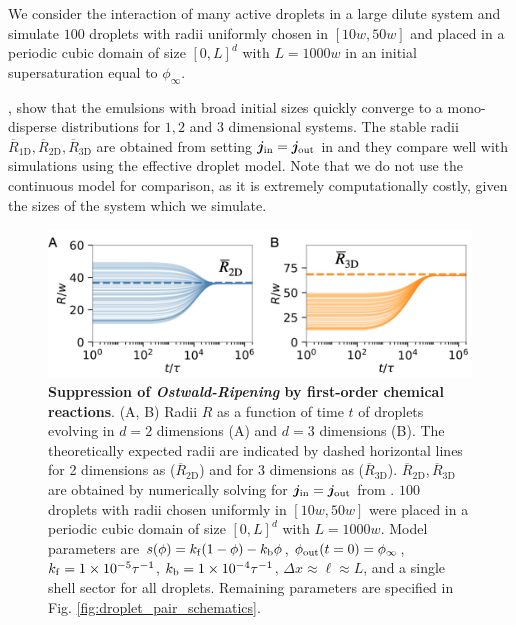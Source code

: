We consider the interaction of many active droplets in a large dilute system and simulate $100$ droplets with radii uniformly chosen in $[10w, 50w]$ and placed in a periodic cubic domain of size $[0, L]^d$ with $L=1000 w$ in an initial supersaturation equal to $\phi_\infty$.

,  show that the emulsions with broad initial sizes quickly converge to a mono-disperse  distributions for $1, 2$ and $3$ dimensional systems.
The stable radii $\overline{R}_\mathrm{1D}, \overline{R}_\mathrm{2D}, \overline{R}_\mathrm{3D}$ are obtained from setting $\boldsymbol{j}_\mathrm{in} = \boldsymbol{j}_\mathrm{out}$ in  and they compare well with simulations using the effective droplet model.
Note that we do not use the continuous model for comparison, as it is extremely computationally costly, given the sizes of the system which we simulate. 

\begin{figure}[tb]
\centering
\includegraphics[scale=0.5]{MainContent/Figures/active_emulsions.pdf}
\caption{
\textbf{Suppression of \textit{Ostwald-Ripening} by first-order chemical reactions}.
(A, B) Radii $R$ as a function of time $t$ of droplets evolving in $d=2$ dimensions (A) and $d=3$ dimensions (B).
The theoretically expected radii are indicated by dashed horizontal lines for 2 dimensions as ($\overline{R}_\mathrm{2D}$) and for 3 dimensions as ($\overline{R}_\mathrm{3D}$). 
$\overline{R}_\mathrm{2D}, \overline{R}_\mathrm{3D}$ are obtained by numerically solving for $\boldsymbol{j}_\mathrm{in} = \boldsymbol{j}_\mathrm{out}$ from .
$100$ droplets with radii chosen uniformly in $[10w, 50w]$ were placed in a periodic cubic domain of size $[0, L]^d$ with $L=1000 w$.
Model parameters are $s(\phi)= k_\mathrm{f} (1 - \phi) - k_\mathrm{b} \phi$, $\phi_\mathrm{out}(t=0) =\phi_\infty$, $k_\mathrm{f} = 1 \times 10^{-5} \tau^{-1}$, $k_\mathrm{b} = 1 \times 10^{-4}  \tau^{-1}$, $\Delta x \approx \ell \approx L$, and a single shell sector for all droplets.
Remaining parameters are specified in Fig. \ref{fig:droplet_pair_schematics}.
}
\label{fig:active_emulsions}
\end{figure}

